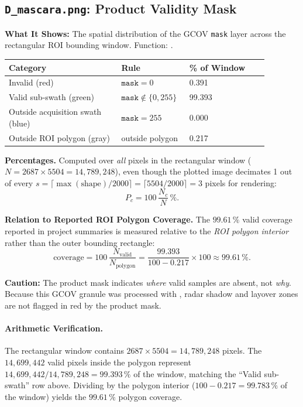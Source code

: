 \documentclass[11pt,a4paper]{article}
\begin{document}
\subsection{\texttt{D\_mascara.png}: Product Validity Mask}

\textbf{What It Shows:} The spatial distribution of the GCOV \texttt{mask} layer across the rectangular ROI bounding window. Function: .

\begin{longtable}{p{0.40\linewidth}p{0.20\linewidth}p{0.28\linewidth}}
\toprule
\textbf{Category} & \textbf{Rule} & \textbf{\% of Window} \\
\midrule
Invalid (red) & $\texttt{mask} = 0$ & 0.391 \\
Valid sub-swath (green) & $\texttt{mask} \notin \{0,255\}$ & 99.393 \\
Outside acquisition swath (blue) & $\texttt{mask} = 255$ & 0.000 \\
Outside ROI polygon (gray) & outside polygon & 0.217 \\
\bottomrule
\end{longtable}

\textbf{Percentages.} Computed over \emph{all} pixels in the rectangular window ($N = 2687 \times 5504 = 14,789,248$), even though the plotted image decimates 1 out of every $s = \lceil \max(\text{shape}) / 2000 \rceil = \lceil 5504/2000 \rceil = 3$ pixels for rendering:
\begin{equation}
  P_c = 100\,\frac{N_c}{N}\,\mathrm{\%}.
\end{equation}

\textbf{Relation to Reported ROI Polygon Coverage.} The $99.61\,\%$ valid coverage reported in project summaries is measured relative to the \emph{ROI polygon interior} rather than the outer bounding rectangle:
\begin{equation}
  \text{coverage} = 100\,\frac{N_{\text{valid}}}{N_{\text{polygon}}}
  = \frac{99.393}{100 - 0.217}\times 100 \approx 99.61\,\mathrm{\%}.
\end{equation}

\textbf{Caution:} The product mask indicates \emph{where} valid samples are absent, not \emph{why}. Because this GCOV granule was processed with , radar shadow and layover zones are not flagged in red by the product mask.

\paragraph{Arithmetic Verification.} The rectangular window contains $2687\times5504=14,789,248$ pixels. The $14,699,442$ valid pixels inside the polygon represent $14,699,442/14,789,248=99.393\,\mathrm{\%}$ of the window, matching the ``Valid sub-swath'' row above. Dividing by the polygon interior ($100 - 0.217 = 99.783\,\mathrm{\%}$ of the window) yields the $99.61\,\mathrm{\%}$ polygon coverage.
\end{document}
